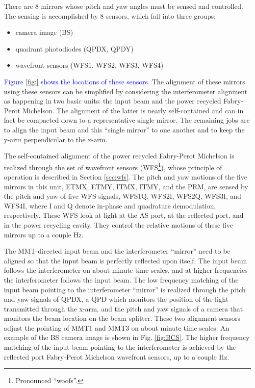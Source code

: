 There are 8 mirrors whose pitch and yaw angles must be sensed and controlled. The sensing is accomplished by 8 sensors, which fall into three groups:
\begin{itemize}
\item camera image (BS)  \vspace{-10pt}
\item quadrant photodiodes (QPDX, QPDY) \vspace{-10pt}
\item wavefront sensors (WFS1, WFS2, WFS3, WFS4)
\end{itemize}
\textcolor{blue}{Figure \ref{fig:} shows the locations of these sensors.} 
The alignment of these mirrors using these sensors can be simplified by considering the interferometer alignment as happening in two basic units: the input beam and the power recycled Fabry-Perot Michelson. The alignment of the latter is nearly self-contained and can in fact be compacted down to a representative single mirror. The remaining jobs are to align the input beam and this ``single mirror'' to one another and to keep the y-arm perpendicular to the x-arm.

The self-contained alignment of the power recycled Fabry-Perot Michelson is realized through the set of wavefront sensors (WFS\footnote{Pronounced ``woofs''.}), whose principle of operation is described in Section \ref{sec:wfs}. The pitch and yaw motions of the five mirrors in this unit, ETMX, ETMY, ITMX, ITMY, and the PRM, are sensed by the pitch and yaw of five WFS signals, WFS1Q, WFS2I, WFS2Q, WFS3I, and WFS4I, where I and Q denote in-phase and quadrature demodulation, respectively. These WFS look at light at the AS port, at the reflected port, and in the power recycling cavity. They control the relative motions of these five mirrors up to a couple Hz. 

The MMT-directed input beam and the interferometer ``mirror'' need to be aligned so that the input beam is perfectly reflected upon itself. The input beam follows the interferometer on about minute time scales, and at higher frequencies the interferometer follows the input beam. The low frequency matching of the input beam pointing to the interferometer ``mirror'' is realized through the pitch and yaw signals of QPDX, a QPD which monitors the position of the light transmitted through the x-arm, and the pitch and yaw signals of a camera that monitors the beam location on the beam splitter. These two alignment sensors adjust the pointing of MMT1 and MMT3 on about minute time scales. An example of the BS camera image is shown in Fig. \ref{fig:BCS}. The higher frequency matching of the input beam pointing to the interferometer is achieved by the reflected port Fabry-Perot Michelson wavefront sensors, up to a couple Hz.

